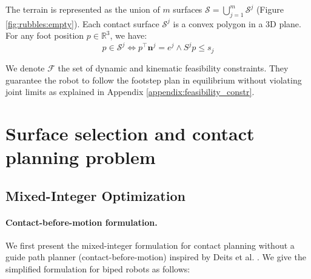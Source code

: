 The terrain is represented as the union of $m$ surfaces $\mathcal{S}= \bigcup_{j=1}^m \mathcal{S}^j$ (Figure \ref{fig:rubbles:empty}). 
Each contact surface $\mathcal{S}^j$ is a convex polygon in a 3D plane. 
For any foot position $p \in \mathbb{R}^{3}$, we have:
\begin{equation}
\label{eq:p_in_S}
    p \in \mathcal{S}^j \iff  p^{\intercal} \textbf{n}^j = e^j \land S^j p \leq s_j 
\end{equation}

We denote $\mathcal{F}$ the set of dynamic and kinematic feasibility constraints. 
They guarantee the robot to follow the footstep plan in equilibrium without violating joint limits as explained in Appendix \ref{appendix:feasibility_constr}.



\section{Surface selection and contact planning problem}
\label{sub:mip:mip}

\subsection{Mixed-Integer Optimization}
\paragraph{Contact-before-motion formulation.\label{par:cbm:formulation}}
We first present the mixed-integer formulation for contact planning without a guide path planner (contact-before-motion) inspired by Deits et al. \cite{deits2014FootPlanMI}. 
We give the simplified formulation for biped robots as follows:

